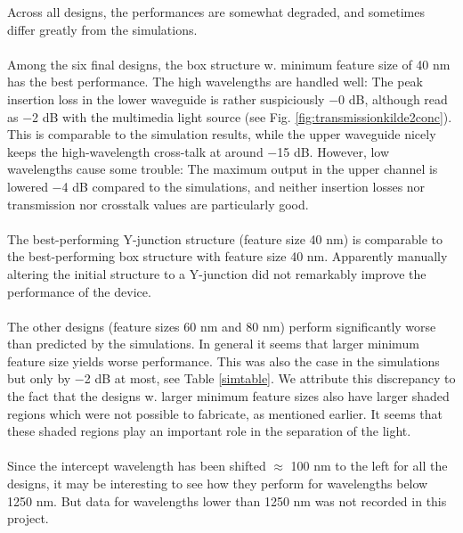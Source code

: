 Across all designs, the performances are somewhat degraded, and sometimes differ greatly from the simulations. \\
\\
Among the six final designs, the box structure w. minimum feature size of 40 nm has the best performance. The high wavelengths are handled well: The peak insertion loss in the lower waveguide is rather suspiciously $-$0 dB, although read as $-$2 dB with the multimedia light source (see Fig. \ref{fig:transmissionkilde2conc}). This is comparable to the simulation results, while the upper waveguide nicely keeps the high-wavelength cross-talk at around $-$15 dB.
However, low wavelengths cause some trouble: The maximum output in the upper channel is lowered $-$4 dB compared to the simulations, and neither insertion losses nor transmission nor crosstalk values are particularly good.\\
\\
The best-performing Y-junction structure (feature size 40 nm) is comparable to the best-performing box structure with feature size 40 nm. Apparently manually altering the initial structure to a Y-junction did not remarkably improve the performance of the device.\\ 
\\
The other designs (feature sizes 60 nm and 80 nm) perform significantly worse than predicted by the simulations. In general it seems that larger minimum feature size yields worse performance. This was also the case in the simulations but only by $-$2 dB at most, see Table \ref{simtable}. We attribute this discrepancy to the fact that the designs w. larger minimum feature sizes also have larger shaded regions which were not possible to fabricate, as mentioned earlier. It seems that these shaded regions play an important role in the separation of the light.\\
\\
Since the intercept wavelength has been shifted $\approx$ 100 nm to the left for all the designs, it may be interesting to see how they perform for wavelengths below 1250 nm. But data for wavelengths lower than 1250 nm was not recorded in this project.\\

